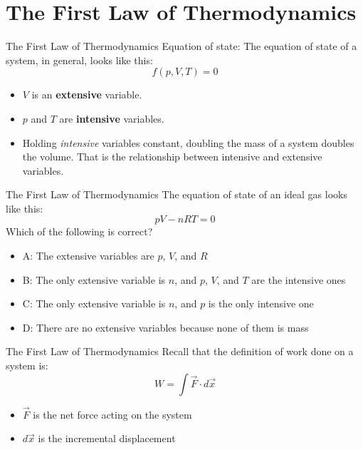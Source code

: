 \documentclass{beamer}
\begin{document}
\section{The First Law of Thermodynamics}

\begin{frame}{The First Law of Thermodynamics}
\alert{Equation of state}: The equation of state of a system, in general, looks like this:
\begin{equation}
f(p,V,T) = 0
\end{equation}
\begin{itemize}
\item $V$ is an \textbf{extensive} variable.
\item $p$ and $T$ are \textbf{intensive} variables.
\item Holding \textit{intensive} variables constant, doubling the mass of a system doubles the volume.  That is the relationship between intensive and extensive variables.
\end{itemize}
\end{frame}

\begin{frame}{The First Law of Thermodynamics}
\alert{The equation of state of an ideal gas} looks like this:
\begin{equation}
pV - nRT = 0
\end{equation}
Which of the following is correct?
\begin{itemize}
\item A: The extensive variables are $p$, $V$, and $R$
\item B: The only extensive variable is $n$, and $p$, $V$, and $T$ are the intensive ones
\item C: The only extensive variable is $n$, and $p$ is the only intensive one
\item D: There are no extensive variables because none of them is mass
\end{itemize}
\end{frame}

\begin{frame}{The First Law of Thermodynamics}
Recall that the definition of work done on a system is:
\begin{equation}
W = \int \vec{F} \cdot d\vec{x}
\label{eq:work}
\end{equation}
\begin{itemize}
\item $\vec{F}$ is the net force acting on the system
\item $d\vec{x}$ is the incremental displacement
\end{itemize}
\end{frame}
\end{document}
